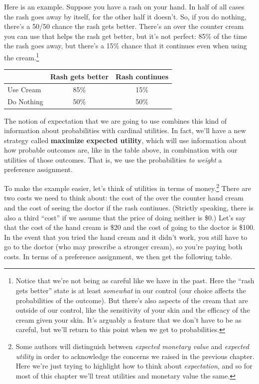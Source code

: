 \documentclass[]{tufte-book}
\begin{document}
Here is an example. Suppose you have a rash on your hand. In half of all cases the rash goes away by itself, for the other half it doesn't. So, if you do nothing, there's a 50/50 chance the rash gets better. There's an over the counter cream you can use that helps the rash get better, but it's not perfect: 85\% of the time the rash goes away, but there's a 15\% chance that it continues even when using the cream.\footnote{Notice that we're not being as careful like we have in the past. Here the ``rash gets better'' state is at least \emph{somewhat} in our control (our choice affects the probabilities of the outcome). But there's also aspects of the cream that are outside of our control, like the sensitivity of your skin and the efficacy of the cream given your skin. It's arguably a feature that we don't have to be as careful, but we'll return to this point when we get to probabilities.}

\begin{longtable}[]{@{}lcc@{}}
\toprule
& Rash gets better & Rash continues\tabularnewline
\midrule
\endhead
Use Cream & 85\% & 15\%\tabularnewline
Do Nothing & 50\% & 50\%\tabularnewline
\bottomrule
\end{longtable}

The notion of expectation that we are going to use combines this kind of information about probabilities with cardinal utilities. In fact, we'll have a new strategy called \textbf{maximize expected utility}, which will use information about how probable outcomes are, like in the table above, in combination with our utilities of those outcomes. That is, we use the probabilities \emph{to weight} a preference assignment.

To make the example easier, let's think of utilities in terms of money.\footnote{Some authors will distinguish between \emph{expected monetary value} and \emph{expected utility} in order to acknowledge the concerns we raised in the previous chapter. Here we're just trying to highlight how to think about \emph{expectation}, and so for most of this chapter we'll treat utilities and monetary value the same.} There are two costs we need to think about: the cost of the over the counter hand cream and the cost of seeing the doctor if the rash continues. (Strictly speaking, there is also a third ``cost'' if we assume that the price of doing neither is \$0.) Let's say that the cost of the hand cream is \$20 and the cost of going to the doctor is \$100. In the event that you tried the hand cream and it didn't work, you still have to go to the doctor (who may prescribe a stronger cream), so you're paying both costs. In terms of a preference assignment, we then get the following table.
\end{document}
